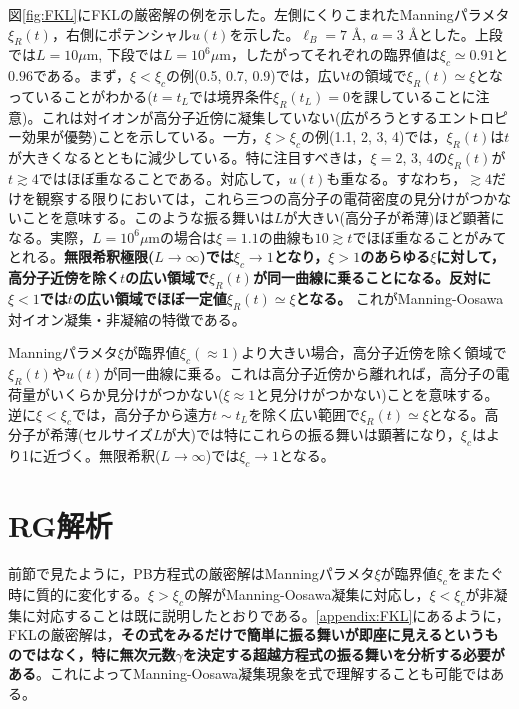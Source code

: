 \documentclass[11pt,a4paper]{ltjsarticle}
\theoremstyle{definition}
\theoremstyle{remark}
\begin{document}
図\ref{fig:FKL}にFKLの厳密解の例を示した。左側にくりこまれたManningパラメタ$\xi_R(t)$，右側にポテンシャル$u(t)$を示した。$\ell_B=7$ \AA , $a=3$ \AA とした。上段では$L=10 \mu$m, 下段では$L=10^6 \mu$m，したがってそれぞれの臨界値は$\xi_c\simeq0.91$と$0.96$である。まず，$\xi<\xi_c$の例(0.5, 0.7, 0.9)では，広い$t$の領域で$\xi_R(t)\simeq\xi$となっていることがわかる($t=t_L$では境界条件$\xi_R(t_L)=0$を課していることに注意)。これは対イオンが高分子近傍に凝集していない(広がろうとするエントロピー効果が優勢)ことを示している。一方，$\xi>\xi_c$の例(1.1, 2, 3, 4)では，$\xi_R(t)$は$t$が大きくなるとともに減少している。特に注目すべきは，$\xi=2$, 3, 4の$\xi_R(t)$が$t\gtrsim 4$ではほぼ重なることである。対応して，$u(t)$も重なる。すなわち，$\gtrsim 4$だけを観察する限りにおいては，これら三つの高分子の電荷密度の見分けがつかないことを意味する。このような振る舞いは$L$が大きい(高分子が希薄)ほど顕著になる。実際，$L=10^6\mu$mの場合は$\xi=1.1$の曲線も$10\gtrsim t$でほぼ重なることがみてとれる。\textbf{無限希釈極限($L\to\infty$)では$\xi_c\to1$となり，$\xi>1$のあらゆる$\xi$に対して，高分子近傍を除く$t$の広い領域で$\xi_R(t)$が同一曲線に乗ることになる。反対に$\xi<1$では$t$の広い領域でほぼ一定値$\xi_R(t)\simeq \xi$となる。} これがManning-Oosawa 対イオン凝集・非凝縮の特徴である。

\begin{pointbox}[title=重要(FKLの厳密解の特徴)]
Manningパラメタ$\xi$が臨界値$\xi_c(\approx 1)$より大きい場合，高分子近傍を除く領域で$\xi_R(t)$や$u(t)$が同一曲線に乗る。これは高分子近傍から離れれば，高分子の電荷量がいくらか見分けがつかない($\xi\approx 1$と見分けがつかない)ことを意味する。逆に$\xi<\xi_c$では，高分子から遠方$t\sim t_L$を除く広い範囲で$\xi_R(t)\simeq \xi$となる。高分子が希薄(セルサイズ$L$が大)では特にこれらの振る舞いは顕著になり，$\xi_c$はより1に近づく。無限希釈($L\to\infty$)では$\xi_c\to 1$となる。
\end{pointbox}

\section{RG解析}
前節で見たように，PB方程式の厳密解はManningパラメタ$\xi$が臨界値$\xi_c$をまたぐ時に質的に変化する。$\xi>\xi_c$の解がManning-Oosawa凝集に対応し，$\xi<\xi_c$が非凝集に対応することは既に説明したとおりである。\ref{appendix:FKL}にあるように，FKLの厳密解は，\textbf{その式をみるだけで簡単に振る舞いが即座に見えるというものではなく，特に無次元数$\gamma$を決定する超越方程式の振る舞いを分析する必要がある}。これによってManning-Oosawa凝集現象を式で理解することも可能ではある。
\end{document}
